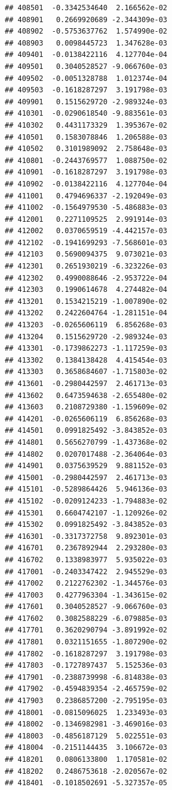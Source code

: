 \begin{frame}[fragile]
\begin{verbatim}
## 408501  -0.3342534640  2.166562e-02
## 408901   0.2669920689 -2.344309e-03
## 408902  -0.5753637762  1.574990e-02
## 408903   0.0098445723  1.347628e-03
## 409401  -0.0138422116  4.127704e-04
## 409501   0.3040528527 -9.066760e-03
## 409502  -0.0051328788  1.012374e-04
## 409503  -0.1618287297  3.191798e-03
## 409901   0.1515629720 -2.989324e-03
## 410301  -0.0290618540 -9.883561e-03
## 410302   0.4431173329  1.395367e-02
## 410501   0.1583078846  1.206588e-03
## 410502   0.3101989092  2.758648e-03
## 410801  -0.2443769577  1.088750e-02
## 410901  -0.1618287297  3.191798e-03
## 410902  -0.0138422116  4.127704e-04
## 411001   0.4794696337 -2.192049e-03
## 411002  -0.1564979530 -5.486883e-03
## 412001   0.2271109525  2.991914e-03
## 412002   0.0370659519 -4.442157e-03
## 412102  -0.1941699293 -7.568601e-03
## 412103   0.5690094375  9.073021e-03
## 412301   0.2651930219 -6.323226e-03
## 412302   0.4990088646 -2.953722e-04
## 412303   0.1990614678  4.274482e-04
## 413201   0.1534215219 -1.007890e-02
## 413202   0.2422604764 -1.281151e-04
## 413203  -0.0265606119  6.856268e-03
## 413204   0.1515629720 -2.989324e-03
## 413301  -0.1739862273 -1.117259e-03
## 413302   0.1384138428  4.415454e-03
## 413303   0.3658684607 -1.715803e-02
## 413601  -0.2980442597  2.461713e-03
## 413602   0.6473594638 -2.655480e-02
## 413603   0.2108729380 -1.159609e-02
## 414201  -0.0265606119  6.856268e-03
## 414501   0.0991825492 -3.843852e-03
## 414801   0.5656270799 -1.437368e-02
## 414802   0.0207017488 -2.364064e-03
## 414901   0.0375639529  9.881152e-03
## 415001  -0.2980442597  2.461713e-03
## 415101  -0.5289864426  5.946136e-03
## 415102  -0.0209124233 -1.794883e-02
## 415301   0.6604742107 -1.120926e-02
## 415302   0.0991825492 -3.843852e-03
## 416301  -0.3317372758  9.892301e-03
## 416701   0.2367892944  2.293280e-03
## 416702   0.1338983977  5.935022e-03
## 417001  -0.2403347422  2.945529e-03
## 417002   0.2122762302 -1.344576e-03
## 417003   0.4277963304 -1.343615e-02
## 417601   0.3040528527 -9.066760e-03
## 417602   0.3082588229 -6.079885e-03
## 417701   0.3620290794 -3.891992e-02
## 417801   0.0321151655 -1.807290e-02
## 417802  -0.1618287297  3.191798e-03
## 417803  -0.1727897437  5.152536e-03
## 417901  -0.2388739998 -6.814838e-03
## 417902  -0.4594839354 -2.465759e-02
## 417903   0.2386857200 -2.795195e-03
## 418001  -0.0815096025  1.233493e-03
## 418002  -0.1346982981 -3.469016e-03
## 418003  -0.4856187129  5.022551e-03
## 418004  -0.2151144435  3.106672e-03
## 418201   0.0806133800  1.170581e-02
## 418202   0.2486753618 -2.020567e-02
## 418401  -0.1018502691 -5.327357e-05

\end{verbatim}
\end{frame}
